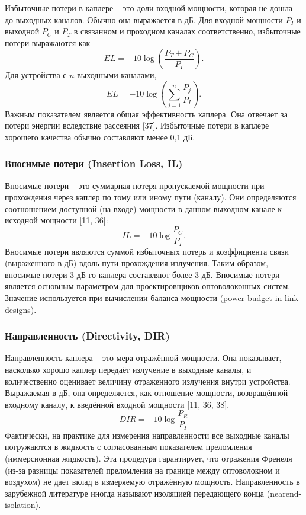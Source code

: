 Избыточные потери в каплере -- это доли входной мощности, которая не дошла до выходных каналов. Обычно она выражается в дБ. Для входной мощности $P_I$ и выходной $P_C$ и $P_T$ в связанном и проходном каналах соответственно, избыточные потери выражаются как
\begin{equation}\label{eq_ch3_2.30}
  EL=-10\log\left(\frac{P_T+P_C}{P_I}\right).
\end{equation}
Для устройства с $n$ выходными каналами,
\begin{equation}\label{eq_ch3_2.31}
  EL=-10\log\left(\sum_{j=1}^n \frac{P_j}{P_I}\right).
\end{equation}
Важным показателем является общая эффективность каплера. Она отвечает за потери энергии вследствие рассеяния [37]. Избыточные потери в каплере хорошего качества обычно составляют менее 0,1 дБ.

\subsubsection*{\textbf{Вносимые потери (Insertion Loss, IL)}}

Вносимые потери -- это суммарная потеря пропускаемой мощности при прохождения через каплер по тому или иному пути (каналу). Они определяются соотношением доступной (на входе) мощности в данном выходном канале к исходной мощности [11, 36]:
\begin{equation}\label{eq_ch3_2.32}
  IL=-10\log\frac{P_C}{P_I}.
\end{equation}
Вносимые потери являются суммой избыточных потерь и коэффициента связи (выраженного в дБ) вдоль пути прохождения излучения. Таким образом, вносимые потери 3 дБ-го каплера составляют более 3 дБ. Вносимые потери является основным параметром для проектировщиков оптоволоконных систем. Значение используется при вычислении баланса мощности (power budget in link designs).

\subsubsection*{\textbf{Направленность (Directivity, DIR)}}

Направленность каплера -- это мера отражённой мощности. Она показывает, насколько хорошо каплер передаёт излучение в выходные каналы, и количественно оценивает величину отраженного излучения внутри устройства. Выражаемая в дБ, она определяется, как отношение мощности, возвращённой входному каналу, к введённой входной мощности [11, 36, 38].
\begin{equation}\label{eq_ch3_2.33}
  DIR=-10\log\frac{P_R}{P_I}
\end{equation}
Фактически, на практике для измерения направленности все выходные каналы погружаются в жидкость с согласованным показателем преломления (иммерсионная жидкость). Эта процедура гарантирует, что отражения Френеля (из-за разницы показателей преломления на границе между оптоволокном и воздухом) не дает вклад в измеряемую отражённую мощность. Направленность в зарубежной литературе иногда называют изоляцией передающего конца (nearend-isolation).


